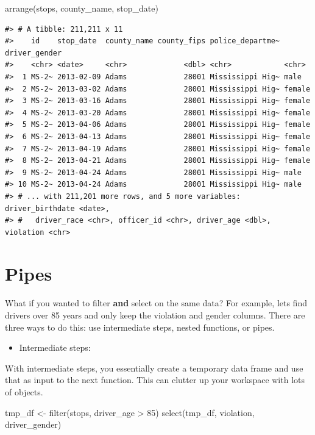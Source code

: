 \documentclass[
]{book}
\newenvironment{Shaded}{\begin{snugshade}}{\end{snugshade}}
\newcommand{\DecValTok}[1]{\textcolor[rgb]{0.00,0.00,0.81}{#1}}
\newcommand{\FunctionTok}[1]{\textcolor[rgb]{0.00,0.00,0.00}{#1}}
\newcommand{\NormalTok}[1]{#1}
\newcommand{\OtherTok}[1]{\textcolor[rgb]{0.56,0.35,0.01}{#1}}
\newcommand{\SpecialCharTok}[1]{\textcolor[rgb]{0.00,0.00,0.00}{#1}}
\providecommand{\tightlist}{%
  \setlength{\itemsep}{0pt}\setlength{\parskip}{0pt}}
\begin{document}
\begin{Shaded}
\begin{Highlighting}[]
\FunctionTok{arrange}\NormalTok{(stops, county\_name, stop\_date)}
\end{Highlighting}
\end{Shaded}

\begin{verbatim}
#> # A tibble: 211,211 x 11
#>    id    stop_date  county_name county_fips police_departme~ driver_gender
#>    <chr> <date>     <chr>             <dbl> <chr>            <chr>        
#>  1 MS-2~ 2013-02-09 Adams             28001 Mississippi Hig~ male         
#>  2 MS-2~ 2013-03-02 Adams             28001 Mississippi Hig~ female       
#>  3 MS-2~ 2013-03-16 Adams             28001 Mississippi Hig~ female       
#>  4 MS-2~ 2013-03-20 Adams             28001 Mississippi Hig~ female       
#>  5 MS-2~ 2013-04-06 Adams             28001 Mississippi Hig~ female       
#>  6 MS-2~ 2013-04-13 Adams             28001 Mississippi Hig~ female       
#>  7 MS-2~ 2013-04-19 Adams             28001 Mississippi Hig~ female       
#>  8 MS-2~ 2013-04-21 Adams             28001 Mississippi Hig~ female       
#>  9 MS-2~ 2013-04-24 Adams             28001 Mississippi Hig~ male         
#> 10 MS-2~ 2013-04-24 Adams             28001 Mississippi Hig~ male         
#> # ... with 211,201 more rows, and 5 more variables: driver_birthdate <date>,
#> #   driver_race <chr>, officer_id <chr>, driver_age <dbl>, violation <chr>
\end{verbatim}

\hypertarget{pipes}{%
\section{Pipes}\label{pipes}}

What if you wanted to filter \textbf{and} select on the same data? For example, lets find drivers over 85 years and only keep the violation and gender columns. There are three ways to do this: use intermediate steps, nested functions, or pipes.

\begin{itemize}
\tightlist
\item
  Intermediate steps:
\end{itemize}

With intermediate steps, you essentially create a temporary data frame and use
that as input to the next function. This can clutter up your workspace with lots
of objects.

\begin{Shaded}
\begin{Highlighting}[]
\NormalTok{tmp\_df }\OtherTok{\textless{}{-}} \FunctionTok{filter}\NormalTok{(stops, driver\_age }\SpecialCharTok{\textgreater{}} \DecValTok{85}\NormalTok{)}
\FunctionTok{select}\NormalTok{(tmp\_df, violation, driver\_gender)}
\end{Highlighting}
\end{Shaded}
\end{document}
